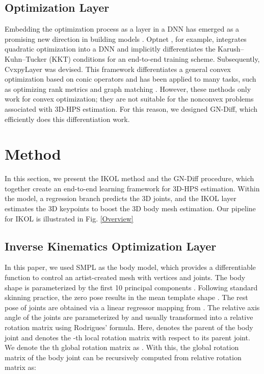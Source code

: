 \documentclass[letterpaper]{article} \usepackage{aaai23}  \usepackage{times}  \usepackage{helvet}  \usepackage{courier}  \usepackage[hyphens]{url}  \usepackage{graphicx} \urlstyle{rm} \def\UrlFont{\rm}  \usepackage{natbib}  \usepackage{caption} \frenchspacing  \setlength{\pdfpagewidth}{8.5in}  \setlength{\pdfpageheight}{11in}  \usepackage{algorithm}
\begin{document}
\subsection{Optimization Layer}
Embedding the optimization process as a layer in a DNN has emerged as a promising new direction in building models \cite{amos2017optnet, agrawal2019differentiable, gould2021deep,sun2022alternating}. Optnet \cite{amos2017optnet}, for example, integrates quadratic optimization into a DNN and implicitly differentiates the Karush–Kuhn–Tucker (KKT) conditions for an end-to-end training scheme. Subsequently, CvxpyLayer \cite{agrawal2019differentiable} was devised. This framework differentiates a general convex optimization based on conic operators and has been applied to many tasks, such as optimizing rank metrics \cite{rolinek2020optimizing} and graph matching \cite{rolinek2020deep}. However, these methods only work for convex optimization; they are not suitable for the nonconvex problems associated with 3D-HPS estimation. For this reason, we designed GN-Diff, which efficiently does this differentiation work. 


\section{Method} In this section, we present the IKOL method and the GN-Diff procedure, which together create an end-to-end learning framework for 3D-HPS estimation. Within the model, a regression branch predicts the 3D joints, and the IKOL layer estimates the 3D keypoints to boost the 3D body mesh estimation. Our pipeline for IKOL is illustrated in Fig. \ref{Overview}






\subsection{Inverse Kinematics Optimization Layer}
In this paper, we used SMPL\cite{loper2015smpl} as the body model, which provides a differentiable function  to control an artist-created mesh with  vertices and  joints. The body shape is parameterized by the first 10 principal components . Following standard skinning practice, the zero pose  results in the mean template shape . The rest pose of joints  are obtained via a linear regressor mapping from . The relative axis angle of the joints are parameterized by  and usually transformed into a relative rotation matrix  using Rodrigues’ formula. Here,  denotes the parent of the body joint  and  denotes the -th local rotation matrix with respect to its parent joint. We denote the th global rotation matrix as . With this, the global rotation matrix of the body joint  can be recursively computed from relative rotation matrix as:
\end{document}
